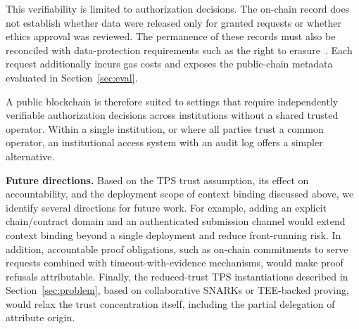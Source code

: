 This verifiability is limited to authorization decisions.
The on-chain record does not establish whether data were released only for granted requests or whether ethics approval was reviewed.
The permanence of these records must also be reconciled with data-protection requirements such as the right to erasure~\cite{haque2021gdpr}.
Each request additionally incurs gas costs and exposes the public-chain metadata evaluated in Section~\ref{sec:eval}.

A public blockchain is therefore suited to settings that require independently verifiable authorization decisions across institutions without a shared trusted operator.
Within a single institution, or where all parties trust a common operator, an institutional access system with an audit log offers a simpler alternative.

\textbf{Future directions.}
Based on the TPS trust assumption, its effect on accountability, and the deployment scope of context binding discussed above, we identify several directions for future work.
For example, adding an explicit chain/contract domain and an authenticated submission channel would extend context binding beyond a single deployment and reduce front-running risk.
In addition, accountable proof obligations, such as on-chain commitments to serve requests combined with timeout-with-evidence mechanisms, would make proof refusals attributable.
Finally, the reduced-trust TPS instantiations described in Section~\ref{sec:problem}, based on collaborative SNARKs or TEE-backed proving, would relax the trust concentration itself, including the partial delegation of attribute origin.
